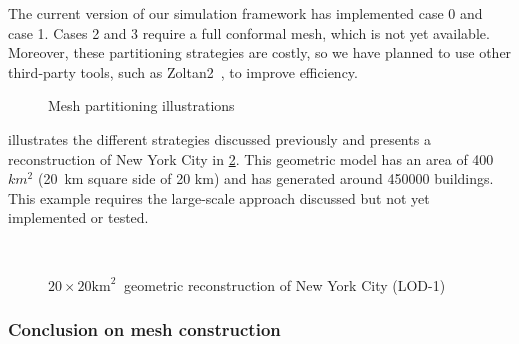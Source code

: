 \documentclass[runningheads]{llncs}
\begin{document}
The current version of our simulation framework has implemented case 0 and case 1. Cases 2 and 3 require a full conformal mesh, which is not yet available. Moreover, these partitioning strategies are costly, so we have planned to use other third-party tools, such as Zoltan2~\cite{the_zoltan2_team_zoltan2_nodate}, to improve efficiency.
\begin{figure}
\centering
{}
\caption{Mesh partitioning illustrations}
\label{fig:partitioning}
\end{figure}

 illustrates the different strategies discussed previously and presents a reconstruction of New York City in \cref{fig:city-ny-largescale}. This geometric model has an area of 400 $km^2$ (20 km square side of 20 km) and has generated around 450000 buildings. This example requires the large-scale approach discussed but not yet implemented or tested.

\begin{figure}[htbp]
\centering
{}
\hfill
{}\\
\hfill
{}
\caption{$20 \times 20 \mathrm{km}^2\ $ geometric reconstruction of New York City (LOD-1)}
\label{fig:city-ny-largescale}
\end{figure}


\subsubsection{Conclusion on mesh construction}
\end{document}
